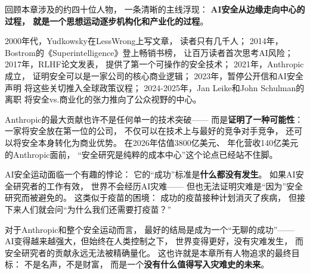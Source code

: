 回顾本章涉及的约四十位人物，
一条清晰的主线浮现：
\textbf{AI安全从边缘走向中心的过程，
就是一个思想运动逐步机构化和产业化的过程}。

2000年代，Yudkowsky在LessWrong上写文章，
读者只有几千人；
2014年，Bostrom的《Superintelligence》登上畅销书榜，
让百万读者首次思考AI风险；
2017年，RLHF论文发表，
提供了第一个可操作的安全技术；
2021年，Anthropic成立，
证明安全可以是一家公司的核心商业逻辑；
2023年，暂停公开信和AI安全声明
将这些关切推入全球政策议程；
2024-2025年，Jan Leike和John Schulman的离职
将安全vs.商业化的张力推向了公众视野的中心。

Anthropic的最大贡献也许不是任何单一的技术突破——
而是\textbf{证明了一种可能性}：
一家将安全放在第一位的公司，
不仅可以在技术上与最好的竞争对手竞争，
还可以将安全本身转化为商业优势。
在2026年估值3800亿美元、
年化营收140亿美元的Anthropic面前，
``安全研究是纯粹的成本中心''这个论点已经站不住脚。

\begin{whybox}[安全运动的成功悖论]
AI安全运动面临一个有趣的悖论：
它的``成功''标准是\textbf{什么都没有发生}。
如果AI安全研究者的工作有效，
世界不会经历AI灾难——
但也无法证明灾难是``因为''安全研究而被避免的。
这类似于疫苗的困境：
成功的疫苗接种计划消灭了疾病，
但接下来人们就会问``为什么我们还需要打疫苗？''

对于Anthropic和整个安全运动而言，
最好的结局是成为一个``无聊的成功''——
AI变得越来越强大，但始终在人类控制之下，
世界变得更好，没有灾难发生，
而安全研究者的贡献永远无法被精确量化。
这也许就是本章所有人物追求的最终目标：
不是名声，不是财富，
而是一个\textbf{没有什么值得写入灾难史的未来}。
\end{whybox}
